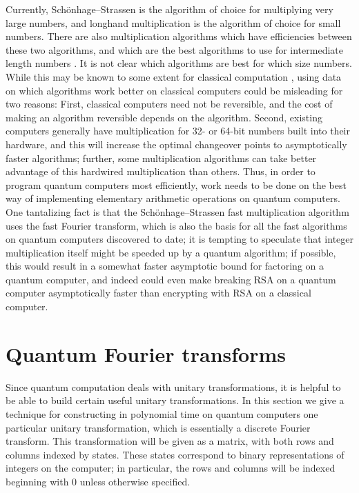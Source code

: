 Currently, Sch\"onhage--Strassen is the algorithm of choice for 
multiplying very large numbers, and longhand multiplication is the algorithm 
of choice for small numbers.
There are also multiplication algorithms which have efficiencies between
these two algorithms, and which are the best
algorithms to use for intermediate length numbers \cite{KaOf,Knut,ScGrVe}.  
It is not clear which algorithms are best for which size numbers.  
While this may be known to some extent for classical computation 
\cite{ScGrVe}, using data on which algorithms work better on classical 
computers could be misleading for two reasons:  First, classical computers 
need not be reversible, and the cost of making an algorithm reversible 
depends on the algorithm.  Second, existing computers generally have 
multiplication for 32- or 64-bit numbers built into their hardware, 
and this will increase the optimal changeover points to asymptotically
faster algorithms; further, some multiplication algorithms can take 
better advantage of this hardwired multiplication than others.  Thus, 
in order to program quantum computers most efficiently, work needs
to be done on the best way of implementing elementary arithmetic 
operations on quantum computers.  One tantalizing fact is that the
Sch\"onhage--Strassen fast multiplication algorithm uses the fast
Fourier transform, which is also the basis for all the fast algorithms
on quantum computers discovered to date; it is tempting to speculate
that integer multiplication itself might be speeded up by a quantum
algorithm; if possible, this would result in a somewhat faster asymptotic
bound for factoring on a quantum computer, and indeed could even
make breaking RSA on a quantum computer asymptotically faster 
than encrypting with RSA on a classical computer.

\section{Quantum Fourier transforms}
Since quantum computation deals with unitary transformations, it is helpful
to be able to build certain useful unitary transformations.  In
this section we give a technique for constructing in polynomial time
on quantum computers one particular unitary transformation,
which is essentially a discrete Fourier transform.  This transformation
will be given as a matrix, with both rows and columns indexed
by states.  These states correspond to binary
representations of integers on the computer; in particular, the rows 
and columns will be indexed beginning with 0 unless otherwise specified.

